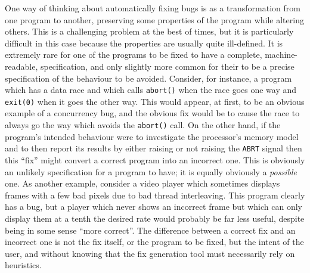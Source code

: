 
One way of thinking about automatically fixing bugs is as a
transformation from one program to another, preserving some properties
of the program while altering others.  This is a challenging problem
at the best of times, but it is particularly difficult in this case
because the properties are usually quite ill-defined.  It is extremely
rare for one of the programs to be fixed to have a complete,
machine-readable, specification, and only slightly more common for
their to be a precise specification of the behaviour to be avoided.
Consider, for instance, a program which has a data race and which
calls \texttt{abort()} when the race goes one way and \texttt{exit(0)}
when it goes the other way.  This would appear, at first, to be an
obvious example of a concurrency bug, and the obvious fix would be to
cause the race to always go the way which avoids the \texttt{abort()}
call.  On the other hand, if the program's intended behaviour were to
investigate the processor's memory model and to then report its
results by either raising or not raising the \texttt{ABRT} signal then
this ``fix'' might convert a correct program into an incorrect one.
This is obviously an unlikely specification for a program to have; it
is equally obviously a \emph{possible} one.  As another example,
consider a video player which sometimes displays frames with a few bad
pixels due to bad thread interleaving.  This program clearly has a
bug, but a player which never shows an incorrect frame but which can
only display them at a tenth the desired rate would probably be far
less useful, despite being in some sense ``more correct''.  The
difference between a correct fix and an incorrect one is not the fix
itself, or the program to be fixed, but the intent of the user, and
without knowing that the fix generation tool must necessarily rely on
heuristics.

